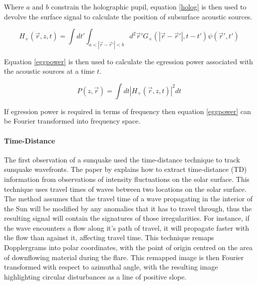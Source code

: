 Where $a$ and $b$ constrain the holographic pupil, equation \ref{holog} is then used to devolve the surface signal to calculate the position of subsurface acoustic sources.

\begin{equation}\label{holog}
H_{+}(\vec{r},z,t)= \int dt'  \int_{a<|\vec{r}-\vec{r}'|<b} d^{2}\vec{r}'G_{+}(|\vec{r}-\vec{r}'|,t-t')\psi(\vec{r}',t')
\end{equation}

Equation \ref{eggpower} is then used to calculate the egression power associated with the acoustic sources at a time $t$.

\begin{equation}\label{eggpower}
P(z,\vec{r})=\int dt|H_{+}(\vec{r},z,t)|^{2}dt
\end{equation}

If egression power is required in terms of frequency then equation \ref{eggpower} can be Fourier transformed into frequency space.


\paragraph{Time-Distance}\label{TD}
The first observation of a sunquake \citep{1998Natur.393..317K} used the time-distance technique to track sunquake wavefronts. The paper by \cite{1993Natur.362..430D} explains how to extract time-distance (TD) information from observations of intensity fluctuations on the solar surface. This technique uses travel times of waves between two locations on the solar surface. The method assumes that the travel time of a wave propagating in the interior of the Sun will be modified by any anomalies that it has to travel through, thus the resulting signal will contain the signatures of those irregularities. For instance, if the wave encounters a flow along it's path of travel, it will propagate faster with the flow than against it, affecting travel time.
This technique remaps Dopplergrams into polar coordinates, with the point of origin centred on the area of downflowing material during the flare. This remapped image is then Fourier transformed with respect to azimuthal angle, with the resulting image highlighting circular disturbances as a line of positive slope.

